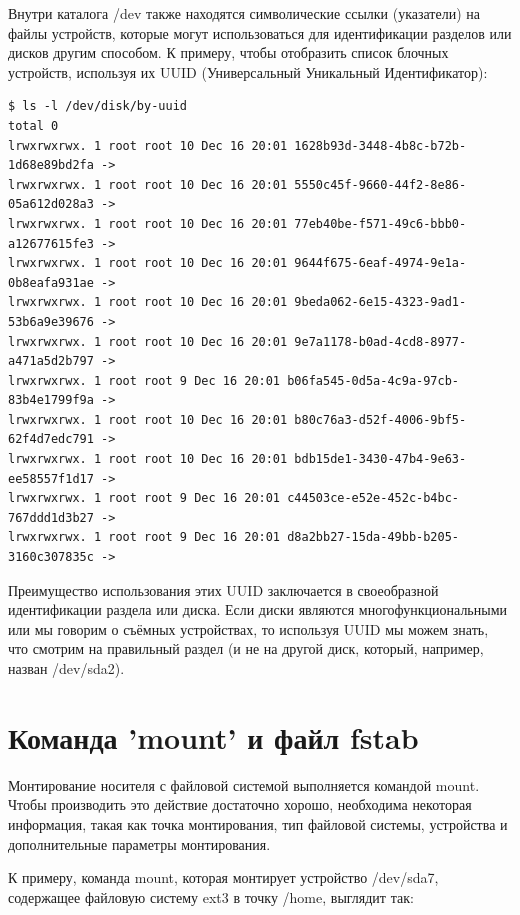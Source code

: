 \documentclass[10pt]{book}
\begin{document}
Внутри каталога /dev также находятся символические ссылки (указатели) на файлы устройств, которые могут использоваться для идентификации разделов или дисков другим способом. К примеру, чтобы отобразить список блочных устройств, используя их UUID (Универсальный Уникальный Идентификатор):

\vspace{3mm}
\begin{tcolorbox}
\begin{lstlisting}
$ ls -l /dev/disk/by-uuid
total 0
lrwxrwxrwx. 1 root root 10 Dec 16 20:01 1628b93d-3448-4b8c-b72b-1d68e89bd2fa -> 
lrwxrwxrwx. 1 root root 10 Dec 16 20:01 5550c45f-9660-44f2-8e86-05a612d028a3 ->
lrwxrwxrwx. 1 root root 10 Dec 16 20:01 77eb40be-f571-49c6-bbb0-a12677615fe3 ->
lrwxrwxrwx. 1 root root 10 Dec 16 20:01 9644f675-6eaf-4974-9e1a-0b8eafa931ae ->
lrwxrwxrwx. 1 root root 10 Dec 16 20:01 9beda062-6e15-4323-9ad1-53b6a9e39676 -> 
lrwxrwxrwx. 1 root root 10 Dec 16 20:01 9e7a1178-b0ad-4cd8-8977-a471a5d2b797 -> 
lrwxrwxrwx. 1 root root 9 Dec 16 20:01 b06fa545-0d5a-4c9a-97cb-83b4e1799f9a -> 
lrwxrwxrwx. 1 root root 10 Dec 16 20:01 b80c76a3-d52f-4006-9bf5-62f4d7edc791 -> 
lrwxrwxrwx. 1 root root 10 Dec 16 20:01 bdb15de1-3430-47b4-9e63-ee58557f1d17 ->
lrwxrwxrwx. 1 root root 9 Dec 16 20:01 c44503ce-e52e-452c-b4bc-767ddd1d3b27 ->
lrwxrwxrwx. 1 root root 9 Dec 16 20:01 d8a2bb27-15da-49bb-b205-3160c307835c ->
\end{lstlisting}
\end{tcolorbox}

Преимущество использования этих UUID заключается в своеобразной идентификации раздела или диска. Если диски являются многофункциональными или мы говорим о съёмных устройствах, то используя UUID мы можем знать, что смотрим на правильный раздел (и не на другой диск, который, например, назван /dev/sda2).

\section{Команда 'mount' и файл fstab}

Монтирование носителя с файловой системой выполняется командой mount. Чтобы производить это действие достаточно хорошо, необходима некоторая информация, такая как точка монтирования, тип файловой системы, устройства и дополнительные параметры монтирования.

К примеру, команда mount, которая монтирует устройство /dev/sda7, содержащее файловую систему ext3 в точку /home, выглядит так:
\end{document}
